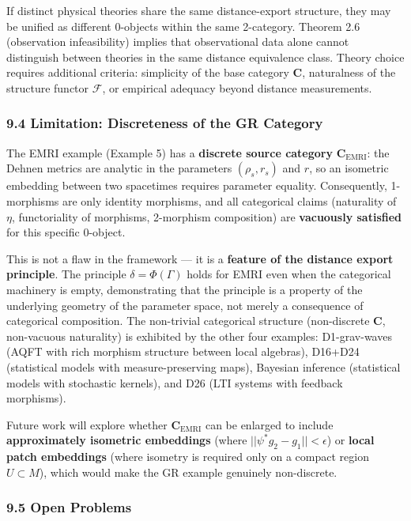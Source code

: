 \documentclass[
]{article}
\begin{document}
If distinct physical theories share the same distance-export structure,
they may be unified as different 0-objects within the same 2-category.
Theorem 2.6 (observation infeasibility) implies that observational data
alone cannot distinguish between theories in the same distance
equivalence class. Theory choice requires additional criteria:
simplicity of the base category \(\mathbf{C}\), naturalness of the
structure functor \(\mathcal{F}\), or empirical adequacy beyond distance
measurements.

\subsubsection{9.4 Limitation: Discreteness of the GR
Category}\label{limitation-discreteness-of-the-gr-category}

The EMRI example (Example 5) has a \textbf{discrete source category}
\(\mathbf{C}_{\text{EMRI}}\): the Dehnen metrics are analytic in the
parameters \((\rho_s, r_s)\) and \(r\), so an isometric embedding
between two spacetimes requires parameter equality. Consequently,
1-morphisms are only identity morphisms, and all categorical claims
(naturality of \(\eta\), functoriality of morphisms, 2-morphism
composition) are \textbf{vacuously satisfied} for this specific
0-object.

This is not a flaw in the framework --- it is a \textbf{feature of the
distance export principle}. The principle \(\delta = \Phi(\Gamma)\)
holds for EMRI even when the categorical machinery is empty,
demonstrating that the principle is a property of the underlying
geometry of the parameter space, not merely a consequence of categorical
composition. The non-trivial categorical structure (non-discrete
\(\mathbf{C}\), non-vacuous naturality) is exhibited by the other four
examples: D1-grav-waves (AQFT with rich morphism structure between local
algebras), D16+D24 (statistical models with measure-preserving maps),
Bayesian inference (statistical models with stochastic kernels), and D26
(LTI systems with feedback morphisms).

Future work will explore whether \(\mathbf{C}_{\text{EMRI}}\) can be
enlarged to include \textbf{approximately isometric embeddings} (where
\(||\psi^* g_2 - g_1|| < \epsilon\)) or \textbf{local patch embeddings}
(where isometry is required only on a compact region \(U \subset M\)),
which would make the GR example genuinely non-discrete.

\subsubsection{9.5 Open Problems}\label{open-problems}
\end{document}

